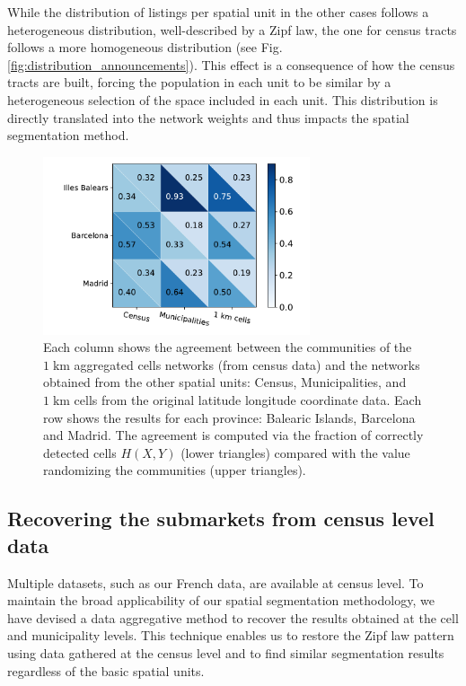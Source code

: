 While the distribution of listings per spatial unit in the other cases follows a heterogeneous distribution, well-described by a Zipf law, the one for census tracts follows a more homogeneous distribution (see Fig. \ref{fig:distribution_announcements}). This effect is a consequence of how the census tracts are built, forcing the population in each unit to be similar by a heterogeneous selection of the space included in each unit. This distribution is directly translated into the network weights and thus impacts the spatial segmentation method. 

\begin{figure}[t]
    \centering
    \includegraphics[width = 0.7\textwidth]{Figs/Idealista_segmentation/Cells1000_agreement_AggCells.pdf}
	\caption[Comparison between the communities from aggregated cells network and other spatial units.]{ Each column shows the agreement between the communities of the $1 \; \textrm{km}$ aggregated cells networks (from census data) and the networks obtained from the other spatial units: Census, Municipalities, and $1 \; \textrm{km}$ cells from the original latitude longitude coordinate data. Each row shows the results for each province: Balearic Islands, Barcelona and Madrid. The agreement is computed via the fraction of correctly detected cells $H(X,Y)$ (lower triangles) compared with the value randomizing the communities (upper triangles). \label{fig:network_sector_distribution}}
\end{figure}

\subsection{Recovering the submarkets from census level data}\label{sec:data_agreggation}

Multiple datasets, such as our French data, are available at census level. To maintain the broad applicability of our spatial segmentation methodology, we have devised a data aggregative method to recover the results obtained at the cell and municipality levels. This technique enables us to restore the Zipf law pattern using data gathered at the census level and to find similar segmentation results regardless of the basic spatial units.

